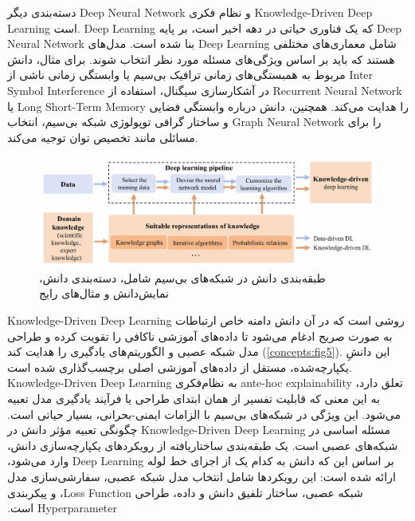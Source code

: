دسته‌بندی دیگر 
\gls{Deep Neural Network}
 و نظام فکری 
\gls{Knowledge-Driven Deep Learning}‬
است. 
\gls{Deep Learning}
که یک فناوری حیاتی در دهه اخیر است، بر پایه 
\gls{Deep Neural Network}
 بنا شده است. مدل‌های 
\gls{Deep Learning}
  شامل معماری‌های مختلفی هستند که باید بر اساس ویژگی‌های مسئله مورد نظر انتخاب شوند. برای مثال، دانش مربوط به همبستگی‌های زمانی ترافیک بی‌سیم یا وابستگی زمانی ناشی از 
\gls{Inter Symbol Interference}
   در آشکارسازی سیگنال، استفاده از 
\gls{Recurrent Neural Network}
    یا 
\gls{Long Short-Term Memory}
    را هدایت می‌کند. همچنین، دانش درباره وابستگی فضایی و ساختار گرافی توپولوژی شبکه بی‌سیم، انتخاب 
\gls{Graph Neural Network}
     را برای مسائلی مانند تخصیص توان توجیه می‌کند.‬
 \begin{figure}
   	\centering
   	\includegraphics[width=0.9\linewidth]{./Pic/ComprehensiveSurvey_concepts_fig5}
   	\caption[ طبقه‌بندی دانش در شبکه‌های بی‌سیم شامل، دسته‌بندی دانش، نمایش‌دانش و مثال‌های رایج]{طبقه‌بندی دانش در شبکه‌های بی‌سیم شامل، دسته‌بندی دانش، نمایش‌دانش و مثال‌های رایج\cite{ComprehensiveSurvey}}
   	\label{concepts:fig5}
 \end{figure}
\gls{Knowledge-Driven Deep Learning}
 روشی است که در آن دانش دامنه خاص ارتباطات به صورت صریح ادغام می‌شود تا داده‌های آموزشی ناکافی را تقویت کرده و طراحی مدل شبکه عصبی و الگوریتم‌های یادگیری را هدایت کند
(\autoref{concepts:fig5}).
 این دانشِ یکپارچه‌شده، مستقل از داده‌های آموزشی اصلی برچسب‌گذاری شده است. 
\gls{Knowledge-Driven Deep Learning}
  به نظام‌فکری 
\gls{ante-hoc explainability}
   تعلق دارد، به این معنی که قابلیت تفسیر از همان ابتدای طراحی یا فرآیند یادگیری مدل تعبیه می‌شود. این ویژگی در شبکه‌های بی‌سیم با الزامات ایمنی-بحرانی، بسیار حیاتی است.‬
‫مسئله اساسی در 
\gls{Knowledge-Driven Deep Learning}
 چگونگی تعبیه مؤثر دانش در شبکه‌های عصبی است. یک طبقه‌بندی ساختاریافته از رویکردهای یکپارچه‌سازی دانش، بر اساس این که دانش به کدام یک از اجزای خط لوله 
\gls{Deep Learning}
  وارد می‌شود، ارائه شده است: این رویکردها شامل انتخاب مدل شبکه عصبی، سفارشی‌سازی مدل شبکه عصبی، ساختار تلفیق دانش و داده، طراحی 
\gls{Loss Function}،
   و پیکربندی 
\gls{Hyperparameter}   
    است.‬
    
